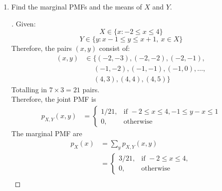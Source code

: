 \documentclass[paper=usletter, fontsize=12pt]{article}
\begin{document}
\begin{enumerate}[label=\textbf{\arabic*}.]
\begin{enumerate}[label=(\alph*)]
            \item Find the marginal PMFs and the means of $X$ and $Y$.
            \begin{proof}[\unskip\nopunct]
                Given:
                \begin{equation*}
                    X \in \{x:-2 \le x \le 4\}
                \end{equation*}
                \begin{equation*}
                    Y \in \{y : x-1 \le y \le x+1, \ x \in X\}
                \end{equation*}
                Therefore, the pairs $(x,y)$ consist of:
                \begin{align*}
                    (x,y) & \in \{ (-2, -3), (-2, -2), (-2, -1), \\
                    & \ \ \ \ \ \ (-1, -2), (-1, -1), (-1, 0), \ldots, \\
                    & \ \ \ \ \ \ (4, 3), (4, 4), (4, 5) \}
                \end{align*}
                Totalling in $7 \times 3 = 21$ pairs.\\
                Therefore, the joint PMF is\\
                \begin{align*}
                    p_{X,Y}(x,y) & =
                    \begin{cases}
                        1/21, & \text{if } -2 \le x \le 4, -1 \le y-x \le 1 \\
                        0, & \text{otherwise}
                    \end{cases}
                \end{align*}
                The marginal PMF are \\
                \begingroup
                \addtolength{\jot}{1em}
                \begin{align*}
                    p_{X}(x) & = \sum_{y}p_{X,Y}(x,y) \\
                    & = \begin{cases}
                        3/21, & \text{if } -2 \le x \le 4, \\
                        0, & \text{otherwise}
                    \end{cases}
                \end{align*}
                \endgroup
                \begingroup
                \addtolength{\jot}{1em}
                \begin{align*}

\end{align*}
\end{proof}
\end{enumerate}
\end{enumerate}
\end{document}
